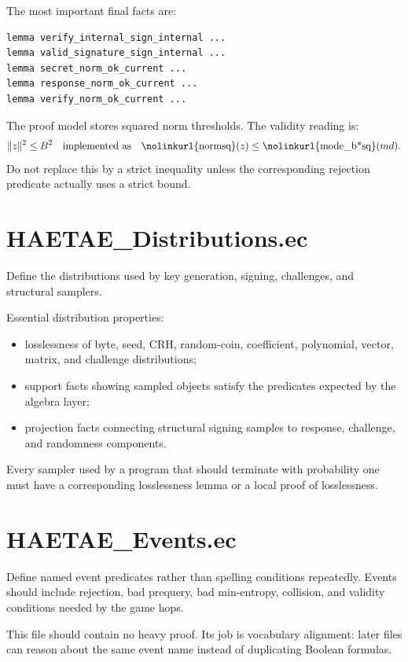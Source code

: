 \documentclass[11pt]{report}
\DeclareRobustCommand{\ec}[1]{\ifmmode\text{\nolinkurl{#1}}\else\nolinkurl{#1}\fi}
\theoremstyle{definition}
\theoremstyle{plain}
\begin{document}
The most important final facts are:

\begin{lstlisting}[language=EasyCrypt]
lemma verify_internal_sign_internal ...
lemma valid_signature_sign_internal ...
lemma secret_norm_ok_current ...
lemma response_norm_ok_current ...
lemma verify_norm_ok_current ...
\end{lstlisting}

The proof model stores squared norm thresholds.  The validity reading is:
\[
  \|z\|^2 \le B^2
  \quad\text{implemented as}\quad
  \ec{normsq}(z)\le \ec{mode\_b*sq}(md).
\]
Do not replace this by a strict inequality unless the corresponding rejection
predicate actually uses a strict bound.

\section{HAETAE\_Distributions.ec}

Define the distributions used by key generation, signing, challenges, and
structural samplers.

Essential distribution properties:

\begin{itemize}
\item losslessness of byte, seed, CRH, random-coin, coefficient, polynomial,
vector, matrix, and challenge distributions;
\item support facts showing sampled objects satisfy the predicates expected by
the algebra layer;
\item projection facts connecting structural signing samples to response,
challenge, and randomness components.
\end{itemize}

Every sampler used by a program that should terminate with probability one must
have a corresponding losslessness lemma or a local proof of losslessness.

\section{HAETAE\_Events.ec}

Define named event predicates rather than spelling conditions repeatedly.
Events should include rejection, bad prequery, bad min-entropy, collision, and
validity conditions needed by the game hops.

This file should contain no heavy proof.  Its job is vocabulary alignment:
later files can reason about the same event name instead of duplicating
Boolean formulas.
\end{document}
